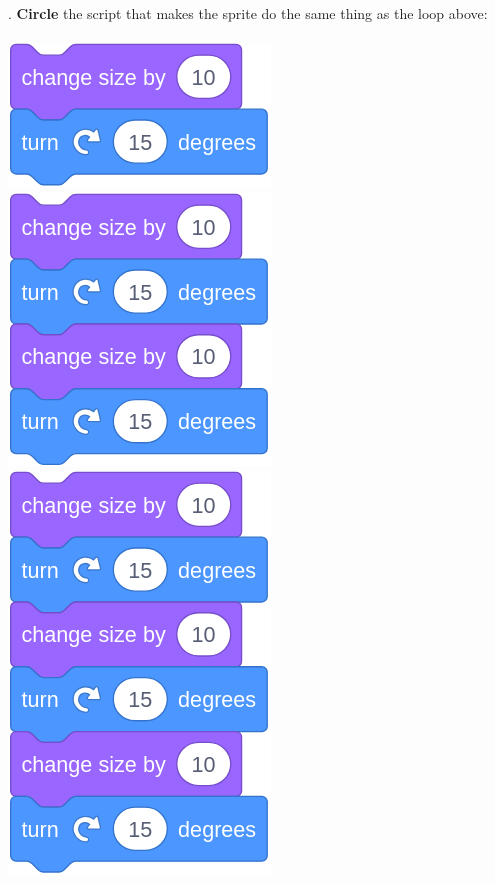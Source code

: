 \documentclass[letterpaper,12pt]{article}
\begin{document}
. \textbf{Circle} the script that makes the sprite do the same thing as the loop above: \\ \\
\includegraphics[scale=.3,valign=t]{q2_script1.png} \hspace{1.25cm}
\includegraphics[scale=.3,valign=t]{q2_script2.png} \hspace{1.25cm}
\includegraphics[scale=.3,valign=t]{q2_script3.png} \hspace{1.25cm}
\end{document}
